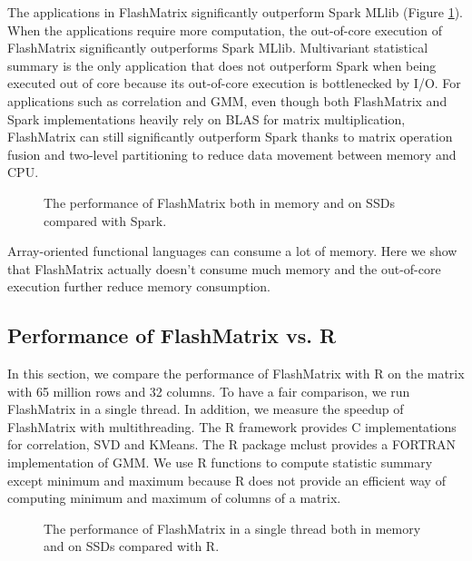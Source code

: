 The applications in FlashMatrix significantly outperform Spark MLlib (Figure
\ref{perf:fm}). When the applications require more computation, the out-of-core
execution of FlashMatrix significantly outperforms Spark MLlib. Multivariant
statistical summary is the only application that does not outperform Spark when
being executed out of core because its out-of-core execution is bottlenecked
by I/O. For applications such as correlation and GMM, even though both FlashMatrix
and Spark implementations heavily rely on BLAS for matrix multiplication,
FlashMatrix can still significantly outperform Spark thanks to matrix operation
fusion and two-level partitioning to reduce data movement between memory and CPU.

\begin{figure}
	\begin{center}
		\footnotesize
		
		\caption{The performance of FlashMatrix both in memory and on SSDs
		compared with Spark.}
		\label{perf:fm}
	\end{center}
\end{figure}

Array-oriented functional languages can consume a lot of memory. Here we show
that FlashMatrix actually doesn't consume much memory and the out-of-core
execution further reduce memory consumption.

\subsection{Performance of FlashMatrix vs. R}
In this section, we compare the performance of FlashMatrix with R on the matrix
with 65 million rows and 32 columns. To have a fair comparison, we run
FlashMatrix in a single thread. In addition, we measure the speedup of
FlashMatrix with multithreading. The R framework provides C implementations
for correlation, SVD and KMeans. The R package mclust \cite{mclust} provides
a FORTRAN implementation of GMM. We use R functions to compute statistic summary
except minimum and maximum because R does not provide an efficient way of
computing minimum and maximum of columns of a matrix.

\begin{figure}
	\begin{center}
		\footnotesize
		
		\caption{The performance of FlashMatrix in a single thread both in memory
		and on SSDs compared with R.}
		\label{fig:fmR}
	\end{center}
\end{figure}

